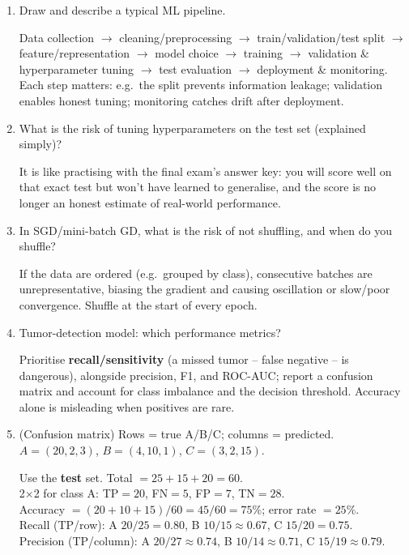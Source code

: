 \documentclass[10pt,a4paper]{article}
\newcommand{\q}[1]{\item #1}
\begin{document}
\begin{enumerate}[leftmargin=*,label=\textbf{Q\arabic*.}]

\q Draw and describe a typical ML pipeline.
\begin{answerbox}
Data collection $\to$ cleaning/preprocessing $\to$ train/validation/test split $\to$ feature/representation $\to$ model choice $\to$ training $\to$ validation \& hyperparameter tuning $\to$ test evaluation $\to$ deployment \& monitoring. Each step matters: e.g.\ the split prevents information leakage; validation enables honest tuning; monitoring catches drift after deployment.
\end{answerbox}

\q What is the risk of tuning hyperparameters on the test set (explained simply)?
\begin{answerbox}
It is like practising with the final exam's answer key: you will score well on that exact test but won't have learned to generalise, and the score is no longer an honest estimate of real-world performance.
\end{answerbox}

\q In SGD/mini-batch GD, what is the risk of not shuffling, and when do you shuffle?
\begin{answerbox}
If the data are ordered (e.g.\ grouped by class), consecutive batches are unrepresentative, biasing the gradient and causing oscillation or slow/poor convergence. Shuffle at the start of every epoch.
\end{answerbox}

\q Tumor-detection model: which performance metrics?
\begin{answerbox}
Prioritise \textbf{recall/sensitivity} (a missed tumor -- false negative -- is dangerous), alongside precision, F1, and ROC-AUC; report a confusion matrix and account for class imbalance and the decision threshold. Accuracy alone is misleading when positives are rare.
\end{answerbox}

\q (Confusion matrix) Rows = true A/B/C; columns = predicted. $A=(20,2,3)$, $B=(4,10,1)$, $C=(3,2,15)$.
\begin{answerbox}
Use the \textbf{test} set. Total $=25+15+20=60$.\\
2$\times$2 for class A: TP$=20$, FN$=5$, FP$=7$, TN$=28$.\\
Accuracy $=(20+10+15)/60=45/60=75\%$; error rate $=25\%$.\\
Recall (TP/row): A $20/25=0.80$, B $10/15\approx0.67$, C $15/20=0.75$.\\
Precision (TP/column): A $20/27\approx0.74$, B $10/14\approx0.71$, C $15/19\approx0.79$.
\end{answerbox}

\end{enumerate}
\end{document}
